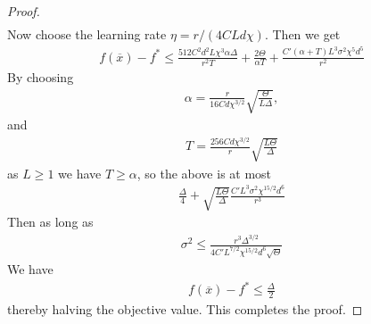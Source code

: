\begin{proof}
\begin{align*}
    \end{align*}
    Now choose the learning rate $\eta = r/(4CLd \chi)$. Then we get
    \begin{align*}
        f(\overline x) - f^* \leq \frac{512 C^2 d^2 L \chi^3 \alpha \Delta}{r^2 T} + \frac{2\Theta}{\alpha T} + \frac{C'(\alpha + T) L^3 \sigma^2 \chi^5 d^5}{r^2}
    \end{align*}
    By choosing 
    \begin{align*}
        \alpha = \frac{r}{16 C d\chi^{3/2}} \sqrt{\frac{\Theta}{L\Delta}},
    \end{align*}
    and
    \begin{align*}
        T = \frac{256 C d \chi^{3/2}}{r} \sqrt{\frac{L\Theta}{\Delta}}
    \end{align*}
    as $L \geq 1$ we have $T \geq \alpha$, so the above is at most
    \begin{align*}
        \frac{\Delta}{4} + \sqrt{\frac{L\Theta}{\Delta}}\frac{C' L^3 \sigma^2 \chi^{15/2} d^6}{r^3}
    \end{align*}
    Then as long as
    \begin{align*}
        \sigma^2 \leq \frac{r^3 \Delta^{3/2}}{4C' L^{7/2} \chi^{15/2} d^6 \sqrt{\Theta}}
    \end{align*}
    We have
    \begin{align*}
        f(\overline x) - f^* \leq \frac{\Delta}{2}
    \end{align*}
    thereby halving the objective value. This completes the proof.
\end{proof}

